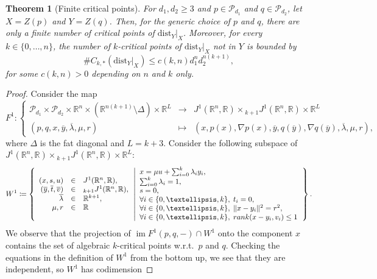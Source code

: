 \documentclass{amsart}
\newcommand{\R}{\mathbb{R}}
\newcommand{\dist}{{\mathrm{dist}_Y|_X}}
\newcommand{\Poly}{\mathscr{P}}
\newtheorem{theorem}[subsubsection]{Theorem}
\theoremstyle{definition}
\theoremstyle{remark}
\begin{document}
\begin{theorem}[Finite critical points]
\label{T:finite-crit-pt}
For $d_1, d_2 \geq 3$ and $p \in \Poly_{d_1}$ and $q\in \Poly_{d_2}$, let $X=Z(p)$ and $Y=Z(q)$. Then, for the generic choice of $p$ and $q$, there are only a finite number of critical points of $\dist$. Moreover, for every $k\in \{0, \ldots, n\}$, the number of $k$-critical points of $\dist$ not in $Y$ is bounded by
$$\#C_{k, *}(\dist)\leq c(k,n)d_1^nd_2^{n(k+1)},$$
for some $c(k,n)>0$ depending on $n$ and $k$ only.\end{theorem}
\begin{proof}
Consider the map
\[
F^1 \colon \left\{ \begin{array}{ccc}
\Poly_{d_1} \times \Poly_{d_2} \times \R^n \times (\R^{n(k + 1)} \setminus \Delta) \times \R^L & \to  & J^1(\R^n, \R) \times {}_{k + 1} J^1(\R^n, \R) \times \R^L \\
(p, q, x, \overline{y}, \overline{\lambda}, \mu, r) & \mapsto & (x, p(x), \nabla p(x), \overline{y}, q(\overline{y}), \nabla q(\overline{y}), \overline{\lambda}, \mu, r),
\end{array}
\right.
\]
where $\Delta$ is the fat diagonal and $L = k + 3$.  Consider the following subspace of $J^1(\R^n, \R) \times {}_{k + 1} J^1(\R^n, \R) \times \R^L$:
\[
W^1 \coloneqq \left\{
\begin{array}{rcl}
(x, s, u) & \in & J^1(\R^n, \R), \\
(\overline{y}, \overline{t}, \overline{v}) & \in & {}_{k + 1} J^1(\R^n, \R), \\
\overline{\lambda} & \in & \R^{k + 1}, \\
\mu, r & \in & \R
\end{array}
\left|
\begin{array}{l}
x = \mu u + \sum_{i = 0}^k \lambda_i y_i, \\
\sum_{i = 0}^k \lambda_i = 1, \\
s = 0, \\
\forall i \in \{0, \ldots, k\}, \; t_i = 0, \\
\forall i \in \{0, \ldots, k\}, \; \| x - y_i \|^2 = r^2, \\
\forall i \in \{0, \ldots, k\}, \; \textnormal{rank}(x - y_i, v_i) \leq 1 \\
\end{array}
\right.
\right\}.
\]
We observe that the projection of $\operatorname{im} F^1(p, q, -) \cap W^1$ onto the component $x$ contains the set of algebraic $k$-critical points w.r.t.\ $p$ and $q$. Checking the equations in the definition of $W^1$ from the bottom up, we see that they are independent, so $W^1$ has codimension

\end{proof}
\end{document}
